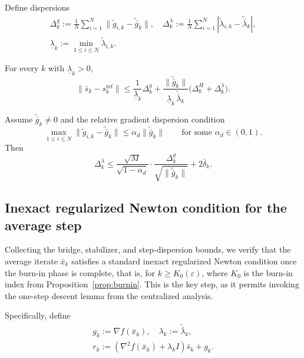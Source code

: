 \documentclass[review,onefignum,onetabnum]{siamart171218}
\begin{document}
Define dispersions
\begin{gather*}
\Delta_k^g:=\tfrac1N\textstyle\sum_{i=1}^N \|\tilde g_{i,k}-\tilde{\bar g}_k\|,\quad
\Delta_k^\lambda:=\tfrac1N\textstyle\sum_{i=1}^N |\tilde\lambda_{i,k}-\tilde{\bar\lambda}_k|,\\
\underline\lambda_k:=\min_{1\le i\le N}\tilde\lambda_{i,k}.
\end{gather*}

\begin{lemma}\label{lem:step-disp}
For every $k$ with $\underline\lambda_k>0$,
\[
\|\bar s_k-s_k^{\mathrm{ref}}\|
\le \frac{1}{\underline\lambda_k}\Delta_k^g
+\frac{\|\tilde{\bar g}_k\|}{\underline\lambda_k\,\tilde{\bar\lambda}_k}\big(\Delta_k^H+\Delta_k^\lambda\big).
\]
\end{lemma}

\begin{lemma}\label{lem:lambda_dispersion}
Assume $\tilde{\bar g}_k\neq 0$ and the relative gradient dispersion condition
\begin{equation}\label{eq:rel_grad_disp}
\max_{1\le i\le N}\|\tilde g_{i,k}-\tilde{\bar g}_k\|\le \alpha_d\|\tilde{\bar g}_k\|
\qquad\text{for some }\alpha_d\in(0,1).
\end{equation}
Then
\begin{equation}\label{eq:lambda_disp_bound}
\Delta_k^\lambda
\le
\frac{\sqrt{M}}{\sqrt{1-\alpha_d}}\cdot\frac{\Delta_k^g}{\sqrt{\|\tilde{\bar g}_k\|}}
+2\bar\delta_k.
\end{equation}
\end{lemma}

\subsection{Inexact regularized Newton condition for the average step}\label{ssec:inexact}
Collecting the bridge, stabilizer, and step-dispersion bounds, we
verify that the average iterate $\bar x_k$ satisfies a standard
inexact regularized Newton condition once the burn-in phase
is complete, that is, for $k\ge K_0(\varepsilon)$, where $K_0$ is the
burn-in index from Proposition~\ref{prop:burnin}.
This is the key step, as it permits invoking the one-step descent
lemma from the centralized analysis.

Specifically, define
\begin{gather*}
g_k:=\nabla f(\bar x_k),\quad
\lambda_k:=\tilde{\bar\lambda}_k,\\
r_k:=(\nabla^2 f(\bar x_k)+\lambda_k I)\bar s_k+g_k.
\end{gather*}
\end{document}
